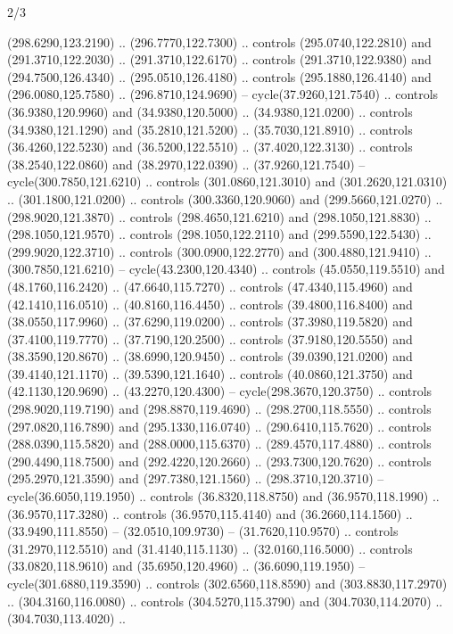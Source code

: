 \begin{flagdescription}{2/3}
\begin{scope}[xshift=0.5\flaglength,yshift=0.5\flagwidth,scale=\stretchfactor]
\begin{scope}[scale=0.001645\flagwidth,yshift=65mm,xshift=-63mm]
\begin{scope}[y=0.80pt, x=0.80pt, yscale=-1,]
\begin{scope}[cm={{1.33333,0.0,0.0,1.33333,(0.0,1e-05)}}]
  (298.6290,123.2190) .. (296.7770,122.7300) .. controls (295.0740,122.2810) and
  (291.3710,122.2030) .. (291.3710,122.6170) .. controls (291.3710,122.9380) and
  (294.7500,126.4340) .. (295.0510,126.4180) .. controls (295.1880,126.4140) and
  (296.0080,125.7580) .. (296.8710,124.9690) -- cycle(37.9260,121.7540) ..
  controls (36.9380,120.9960) and (34.9380,120.5000) .. (34.9380,121.0200) ..
  controls (34.9380,121.1290) and (35.2810,121.5200) .. (35.7030,121.8910) ..
  controls (36.4260,122.5230) and (36.5200,122.5510) .. (37.4020,122.3130) ..
  controls (38.2540,122.0860) and (38.2970,122.0390) .. (37.9260,121.7540) --
  cycle(300.7850,121.6210) .. controls (301.0860,121.3010) and
  (301.2620,121.0310) .. (301.1800,121.0200) .. controls (300.3360,120.9060) and
  (299.5660,121.0270) .. (298.9020,121.3870) .. controls (298.4650,121.6210) and
  (298.1050,121.8830) .. (298.1050,121.9570) .. controls (298.1050,122.2110) and
  (299.5590,122.5430) .. (299.9020,122.3710) .. controls (300.0900,122.2770) and
  (300.4880,121.9410) .. (300.7850,121.6210) -- cycle(43.2300,120.4340) ..
  controls (45.0550,119.5510) and (48.1760,116.2420) .. (47.6640,115.7270) ..
  controls (47.4340,115.4960) and (42.1410,116.0510) .. (40.8160,116.4450) ..
  controls (39.4800,116.8400) and (38.0550,117.9960) .. (37.6290,119.0200) ..
  controls (37.3980,119.5820) and (37.4100,119.7770) .. (37.7190,120.2500) ..
  controls (37.9180,120.5550) and (38.3590,120.8670) .. (38.6990,120.9450) ..
  controls (39.0390,121.0200) and (39.4140,121.1170) .. (39.5390,121.1640) ..
  controls (40.0860,121.3750) and (42.1130,120.9690) .. (43.2270,120.4300) --
  cycle(298.3670,120.3750) .. controls (298.9020,119.7190) and
  (298.8870,119.4690) .. (298.2700,118.5550) .. controls (297.0820,116.7890) and
  (295.1330,116.0740) .. (290.6410,115.7620) .. controls (288.0390,115.5820) and
  (288.0000,115.6370) .. (289.4570,117.4880) .. controls (290.4490,118.7500) and
  (292.4220,120.2660) .. (293.7300,120.7620) .. controls (295.2970,121.3590) and
  (297.7380,121.1560) .. (298.3710,120.3710) -- cycle(36.6050,119.1950) ..
  controls (36.8320,118.8750) and (36.9570,118.1990) .. (36.9570,117.3280) ..
  controls (36.9570,115.4140) and (36.2660,114.1560) .. (33.9490,111.8550) --
  (32.0510,109.9730) -- (31.7620,110.9570) .. controls (31.2970,112.5510) and
  (31.4140,115.1130) .. (32.0160,116.5000) .. controls (33.0820,118.9610) and
  (35.6950,120.4960) .. (36.6090,119.1950) -- cycle(301.6880,119.3590) ..
  controls (302.6560,118.8590) and (303.8830,117.2970) .. (304.3160,116.0080) ..
  controls (304.5270,115.3790) and (304.7030,114.2070) .. (304.7030,113.4020) ..

\end{scope}
\end{scope}
\end{scope}
\end{scope}
\end{flagdescription}
